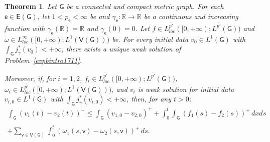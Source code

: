 \documentclass[reqno,12pt]{amsart}
\newtheorem{theorem}{Theorem}[section]
\def\R{\mathbb R} %
\def\e{\mathsf{e}} 	%
\def\v{\mathsf{v}}	%
\newcommand{\G}{\mathsf{G}}	%
\newcommand{\V}{\mathsf{V}}	%
\newcommand{\E}{\mathsf{E}}	%
\numberwithin{equation}{section} %
\begin{document}
\begin{theorem}\label{ExtUniqWea} Let  $\G$ be a  connected and compact metric graph. For each $\e\in \E(\G)$, let $1 < p_\e < \infty$ be and   $\gamma_\e:\R\to \R$ be a continuous and increasing function with $\gamma_\e(\mathbb{R})=\mathbb{R}$ and $\gamma_\e(0)=0$.   Let $f\in L^{\overline{p'}}_{loc}([0,+\infty);L^{\overline{p'}}(\G))$  and   $\omega\in L^{\infty}_{loc}([0,+\infty);L^{1}(\V(\G)))$  be.
  For every initial data 
$v_0 \in L^{1}(\G)$ 
  with $\displaystyle \int_\G j^*_{\overline{\gamma}}(v_{0})<+\infty$, there exists a unique weak solution of Problem~\eqref{evpbintro1711}. 
  
 Moreover, if, for  $i=1,2$,  $f_i  \in L^{\overline{p'}}_{loc}([0,+\infty);L^{\overline{p'}}(\G))$, $\omega_i\in L^{\overline{p'}}_{loc}([0,+\infty);L^{1}(\V(\G)))$,  and $v_i$
  is weak solution for initial data $v_{i,0}\in L^{1}(\G)$  
  with $\displaystyle \int_\G j^*_{\overline{\gamma}}(v_{i,0})<+\infty$, then, for any $t>0$:
$$
\begin{array}{c}
  \displaystyle\int_\G(v_1(t) - v_2(t))^+  \leq \int_\G (v_{1,0}  - v_{2,0})^+
    + \int_0^t \int_\G(f_1(s) - f_2(s))^+\,dxds
   \\ \\
  \displaystyle 
    +\sum_{\v\in\V(\G)}\int_0^t(\omega_1(s,\v)-\omega_2(s,\v))^+\,ds.
\end{array}    
$$
\end{theorem}
\end{document}
